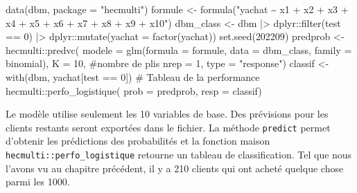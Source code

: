 \documentclass[
  11pt,
  letterpaper,
]{book}
\newenvironment{Shaded}{\begin{snugshade}}{\end{snugshade}}
\newcommand{\AttributeTok}[1]{\textcolor[rgb]{0.40,0.45,0.13}{#1}}
\newcommand{\CommentTok}[1]{\textcolor[rgb]{0.37,0.37,0.37}{#1}}
\newcommand{\DecValTok}[1]{\textcolor[rgb]{0.68,0.00,0.00}{#1}}
\newcommand{\FunctionTok}[1]{\textcolor[rgb]{0.28,0.35,0.67}{#1}}
\newcommand{\NormalTok}[1]{\textcolor[rgb]{0.00,0.23,0.31}{#1}}
\newcommand{\OtherTok}[1]{\textcolor[rgb]{0.00,0.23,0.31}{#1}}
\newcommand{\SpecialCharTok}[1]{\textcolor[rgb]{0.37,0.37,0.37}{#1}}
\newcommand{\StringTok}[1]{\textcolor[rgb]{0.13,0.47,0.30}{#1}}
\theoremstyle{definition}
\theoremstyle{remark}
\begin{document}
\begin{Shaded}
\begin{Highlighting}[]
\FunctionTok{data}\NormalTok{(dbm, }\AttributeTok{package =} \StringTok{"hecmulti"}\NormalTok{)}
\NormalTok{formule }\OtherTok{\textless{}{-}} \FunctionTok{formula}\NormalTok{(}\StringTok{"yachat \textasciitilde{} x1 + x2 + x3 +}
\StringTok{                x4 + x5 + x6 + x7 + x8 + x9 + x10"}\NormalTok{)}
\NormalTok{dbm\_class }\OtherTok{\textless{}{-}}\NormalTok{ dbm }\SpecialCharTok{|\textgreater{}}
\NormalTok{  dplyr}\SpecialCharTok{::}\FunctionTok{filter}\NormalTok{(test }\SpecialCharTok{==} \DecValTok{0}\NormalTok{) }\SpecialCharTok{|\textgreater{}}
\NormalTok{  dplyr}\SpecialCharTok{::}\FunctionTok{mutate}\NormalTok{(}\AttributeTok{yachat =} \FunctionTok{factor}\NormalTok{(yachat))}
\FunctionTok{set.seed}\NormalTok{(}\DecValTok{202209}\NormalTok{)}
\NormalTok{predprob }\OtherTok{\textless{}{-}}\NormalTok{ hecmulti}\SpecialCharTok{::}\FunctionTok{predvc}\NormalTok{(}
  \AttributeTok{modele =} \FunctionTok{glm}\NormalTok{(}\AttributeTok{formula =}\NormalTok{ formule, }
               \AttributeTok{data =}\NormalTok{ dbm\_class, }
               \AttributeTok{family =}\NormalTok{ binomial),}
  \AttributeTok{K =} \DecValTok{10}\NormalTok{, }\CommentTok{\#nombre de plis}
  \AttributeTok{nrep =} \DecValTok{1}\NormalTok{,}
  \AttributeTok{type =} \StringTok{"response"}\NormalTok{)}
\NormalTok{classif }\OtherTok{\textless{}{-}} \FunctionTok{with}\NormalTok{(dbm, yachat[test }\SpecialCharTok{==} \DecValTok{0}\NormalTok{])}
\CommentTok{\# Tableau de la performance}
\NormalTok{hecmulti}\SpecialCharTok{::}\FunctionTok{perfo\_logistique}\NormalTok{(}
  \AttributeTok{prob =}\NormalTok{ predprob,}
  \AttributeTok{resp =}\NormalTok{ classif)}
\end{Highlighting}
\end{Shaded}

Le modèle utilise seulement les 10 variables de base. Des prévisions
pour les clients restants seront exportées dans le fichier. La méthode
\texttt{predict} permet d'obtenir les prédictions des probabilités et la
fonction maison \texttt{hecmulti::perfo\_logistique} retourne un tableau
de classification. Tel que nous l'avons vu au chapitre précédent, il y a
210 clients qui ont acheté quelque chose parmi les 1000.
\end{document}
